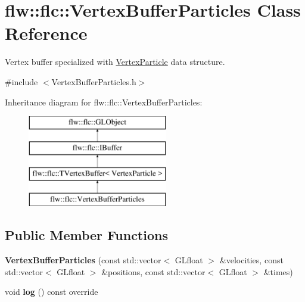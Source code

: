 \hypertarget{classflw_1_1flc_1_1VertexBufferParticles}{}\section{flw\+:\+:flc\+:\+:Vertex\+Buffer\+Particles Class Reference}
\label{classflw_1_1flc_1_1VertexBufferParticles}


Vertex buffer specialized with \hyperlink{structflw_1_1flc_1_1VertexParticle}{Vertex\+Particle} data structure.  




{\ttfamily \#include $<$Vertex\+Buffer\+Particles.\+h$>$}

Inheritance diagram for flw\+:\+:flc\+:\+:Vertex\+Buffer\+Particles\+:\begin{figure}[H]
\begin{center}
\leavevmode
\includegraphics[height=4.000000cm]{classflw_1_1flc_1_1VertexBufferParticles}
\end{center}
\end{figure}
\subsection*{Public Member Functions}
\begin{DoxyCompactItemize}
\item 
{\bfseries Vertex\+Buffer\+Particles} (const std\+::vector$<$ G\+Lfloat $>$ \&velocities, const std\+::vector$<$ G\+Lfloat $>$ \&positions, const std\+::vector$<$ G\+Lfloat $>$ \&times)\hypertarget{classflw_1_1flc_1_1VertexBufferParticles_a80c9a81b788b02bf4968cbea21168d5e}{}\label{classflw_1_1flc_1_1VertexBufferParticles_a80c9a81b788b02bf4968cbea21168d5e}

\item 
void {\bfseries log} () const override\hypertarget{classflw_1_1flc_1_1VertexBufferParticles_a2a4bd9b4f1e6a9ceae2988e2a9d14602}{}\label{classflw_1_1flc_1_1VertexBufferParticles_a2a4bd9b4f1e6a9ceae2988e2a9d14602}

\end{DoxyCompactItemize}
